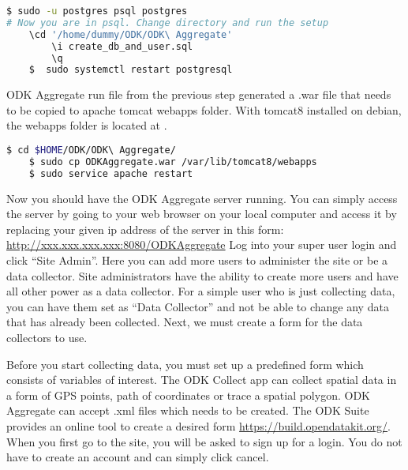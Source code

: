 \begin{lstlisting}[language=bash]
	$ sudo -u postgres psql postgres
# Now you are in psql. Change directory and run the setup
	\cd '/home/dummy/ODK/ODK\ Aggregate'
        \i create_db_and_user.sql
        \q
	$  sudo systemctl restart postgresql
\end{lstlisting}


ODK Aggregate run file from the previous step generated a .war file that needs to be copied to apache tomcat webapps folder. With tomcat8 installed on debian, the webapps folder is located at .


\begin{lstlisting}[language=bash]
	$ cd $HOME/ODK/ODK\ Aggregate/
	$ sudo cp ODKAggregate.war /var/lib/tomcat8/webapps
	$ sudo service apache restart
\end{lstlisting}

Now you should have the ODK Aggregate server running. You can simply access the server by going to your web browser on your local computer and access it by replacing your given ip address of the server in this form: \url{http://xxx.xxx.xxx.xxx:8080/ODKAggregate} Log into your super user login and click ``Site Admin''. Here you can add more users to administer the site or be a data collector. Site administrators have the ability to create more users and have all other power as a data collector. For a simple user who is just collecting data, you can have them set as ``Data Collector'' and not be able to change any data that has already been collected. Next, we must create a form for the data collectors to use.


Before you start collecting data, you must set up a predefined form which consists of variables of interest. The ODK Collect app can collect spatial data in a form of GPS points, path of coordinates or trace a spatial polygon. ODK Aggregate can accept .xml files which needs to be created. The ODK Suite provides an online tool to create a desired form \url{https://build.opendatakit.org/}. When you first go to the site, you will be asked to sign up for a login. You do not have to create an account and can simply click cancel.

